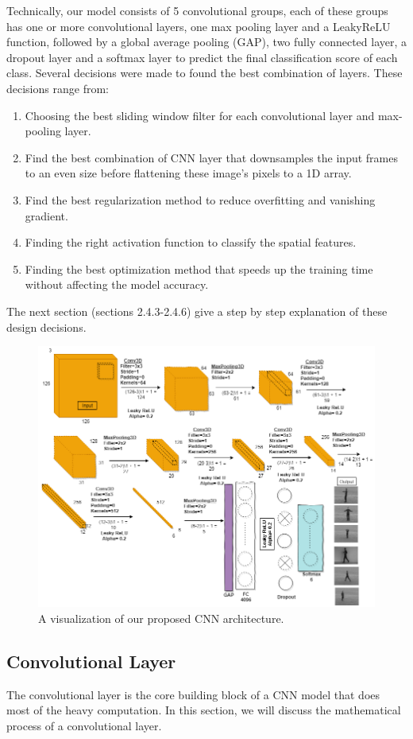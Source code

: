 Technically, our model consists of 5 convolutional groups, each of these groups has one or more convolutional layers, one max pooling layer and a LeakyReLU function, followed by a global average pooling (GAP), two fully connected layer, a dropout  layer and a  softmax layer to predict the final classification score of each class. Several decisions were made to found the best combination of layers. These decisions range from:
\begin{enumerate}
    \item Choosing the best sliding window filter for each convolutional layer and max-pooling layer.
    \item Find the best combination of CNN layer that downsamples the input frames to an even size before flattening these image's pixels to a 1D array.
    \item Find the best regularization method to reduce overfitting and vanishing gradient.
    \item Finding the right activation function to classify the spatial features.
    \item Finding the best optimization method that speeds up the training time without affecting the model accuracy.
\end{enumerate}
The next section (sections 2.4.3-2.4.6) give a step by step explanation of these design decisions.
\begin{figure}[ht]
\centering
\includegraphics[width=0.85\columnwidth]{Figures/nn2.png}
\decoRule
\caption[A visualization of our proposed CNN architecture.]{A visualization of our proposed CNN architecture.}
\label{fig:la2}
\end{figure}

\subsection{Convolutional Layer}
\hspace{5mm} The convolutional layer is the core building block of a CNN model that does most of the heavy computation. In this section, we will discuss the mathematical process of a convolutional layer.\\

